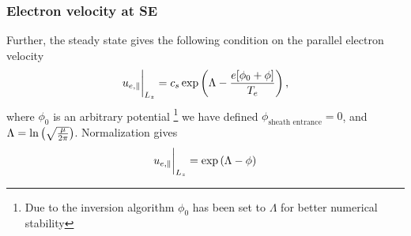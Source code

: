\subsubsection{Electron velocity at SE}
%
Further, the steady state gives the following condition on the parallel
electron velocity
%
\begin{align*}
    u_{e,\|} \bigg|_{L_z} = c_s \exp\left(\Lambda - \frac{e[\phi_0 + \phi]}{T_e}\right),
\end{align*}
%
where $\phi_0$ is an arbitrary potential%
%
\footnote{Due to the inversion algorithm $\phi_0$ has been set to $\Lambda$ for
    better numerical stability}%
%
we have defined $\phi_{\text{sheath entrance}} = 0$, and
$\Lambda=\ln\left(\sqrt{\frac{\mu}{2\pi}}\right)$. Normalization gives
%
\begin{align*}
    u_{e,\|} \bigg|_{L_z} = \exp\left(\Lambda - \phi\right)
\end{align*}
%


